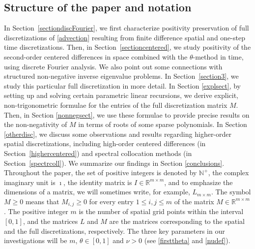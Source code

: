 \documentclass[a4paper]{article}
\newcommand{\nplus}{\mathbb{N}^+}
\newcommand{\rr}{\mathbb{R}}
\begin{document}

\subsection{Structure of the paper and notation}
In Section~\ref{sectiondiscFourier}, we first characterize
positivity preservation of full discretizations of \eqref{advection} resulting from 
finite difference spatial and one-step time discretizations. Then, in Section~\ref{sectioncentered}, we study positivity of the second-order centered differences in space
combined with the $\theta$-method in
time, using discrete Fourier
analysis. We also point out some connections with structured non-negative inverse eigenvalue problems. In Section~\ref{section3}, we study this particular full discretization in more detail.
In Section \ref{explsect}, by setting up and solving certain parametric linear recursions, we derive explicit, non-trigonometric formulae for the entries of the full discretization matrix $M$. Then, in Section \ref{nonnegsect}, we use these formulae to provide precise results on the non-negativity of $M$ in terms of roots of some  sparse polynomials.
In Section \ref{otherdisc}, we discuss some observations and results regarding
higher-order spatial discretizations, including high-order centered differences
(in Section~\ref{highercentered}) and spectral collocation methods (in Section~\ref{spectrcoll}).
We summarize our findings in Section \ref{conclusions}.\\


Throughout the paper, the set of positive integers is denoted by $\nplus$, the complex imaginary unit is $\imath$, the identity matrix is $I\in\rr^{m\times m}$, and to emphasize the dimensions of a matrix, we will sometimes write, for example, $L_{m\times m}$.
The symbol $M\ge 0$ means that  $M_{i,j}\ge 0$ for every entry $1\le i, j\le m$ of the matrix $M\in\mathbb{R}^{m\times m}$. The positive integer $m$ is the number of spatial grid points within the interval $[0,1]$, and the matrices $L$ and $M$ are the matrices corresponding to the spatial and the full discretizations, respectively. The three key parameters in our investigations will be $m$, $\theta\in [0,1]$ and $\nu>0$ (see \eqref{firsttheta} and \eqref{nudef}).
\end{document}
